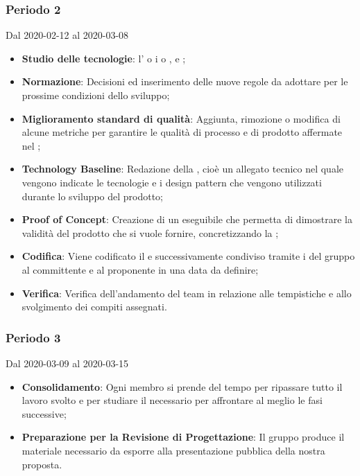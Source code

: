 \subsubsection{Periodo 2} 
Dal 2020-02-12 al 2020-03-08
\begin{itemize}
	\item \textbf{Studio delle tecnologie}: l'  o i   o ,  e ;
	\item \textbf{Normazione}: Decisioni ed inserimento delle nuove regole da adottare per le prossime condizioni dello sviluppo;
	\item \textbf{Miglioramento standard di qualità}: Aggiunta, rimozione o modifica di alcune metriche per garantire le qualità di processo e di prodotto affermate nel \PdQ{};
	\item \textbf{Technology Baseline}: Redazione della , cioè un allegato tecnico nel quale vengono indicate le tecnologie e i design pattern che vengono utilizzati durante lo sviluppo del prodotto;
	\item \textbf{Proof of Concept}: Creazione di un eseguibile che permetta di dimostrare la validità del prodotto che si vuole fornire, concretizzando la ;
	\item \textbf{Codifica}: Viene codificato il  e successivamente condiviso tramite i  del gruppo al committente e al proponente in una data da definire;
	\item \textbf{Verifica}: Verifica dell'andamento del team in relazione alle tempistiche e allo svolgimento dei compiti assegnati.
\end{itemize}

\subsubsection{Periodo 3} 
Dal 2020-03-09 al 2020-03-15
\begin{itemize}
	\item \textbf{Consolidamento}: Ogni membro si prende del tempo per ripassare tutto il lavoro svolto e per studiare il necessario per affrontare al meglio le fasi successive;
	\item \textbf{Preparazione per la Revisione di Progettazione}: Il gruppo produce il materiale necessario da esporre alla presentazione pubblica della nostra proposta.
\end{itemize}

